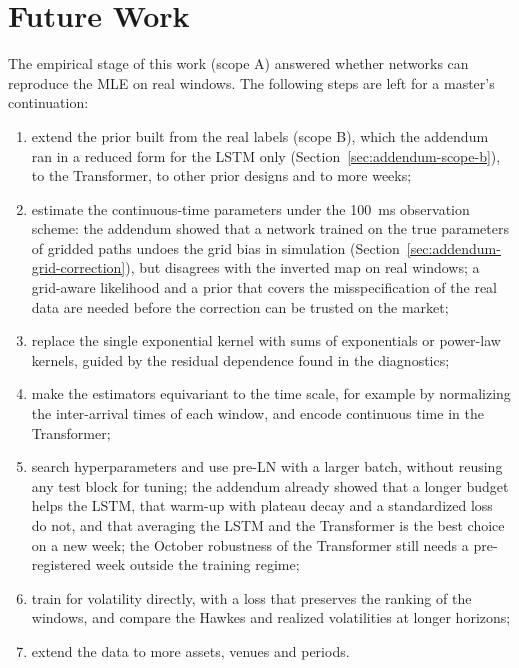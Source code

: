\chapter{Future Work}
\label{cap:futuro}

The empirical stage of this work (scope A) answered whether networks can reproduce the MLE
on real windows. The following steps are left for a master's continuation:
\begin{enumerate}
  \item extend the prior built from the real labels (scope B), which the addendum ran in a
        reduced form for the LSTM only (Section~\ref{sec:addendum-scope-b}), to the
        Transformer, to other prior designs and to more weeks;
  \item estimate the continuous-time parameters under the 100~ms observation scheme: the
        addendum showed that a network trained on the true parameters of gridded paths
        undoes the grid bias in simulation (Section~\ref{sec:addendum-grid-correction}),
        but disagrees with the inverted map on real windows; a grid-aware likelihood
        \citep{lambe2025} and a prior that covers the misspecification of the real data
        are needed before the correction can be trusted on the market;
  \item replace the single exponential kernel with sums of exponentials or power-law
        kernels, guided by the residual dependence found in the diagnostics;
  \item make the estimators equivariant to the time scale, for example by normalizing the
        inter-arrival times of each window, and encode continuous time in the Transformer;
  \item search hyperparameters and use pre-LN with a larger batch, without reusing any test
        block for tuning; the addendum already showed that a longer budget helps the LSTM,
        that warm-up with plateau decay and a standardized loss do not, and that averaging
        the LSTM and the Transformer is the best choice on a new week; the October robustness
        of the Transformer still needs a pre-registered week outside the training regime;
  \item train for volatility directly, with a loss that preserves the ranking of the
        windows, and compare the Hawkes and realized volatilities at longer horizons;
  \item extend the data to more assets, venues and periods.
\end{enumerate}
